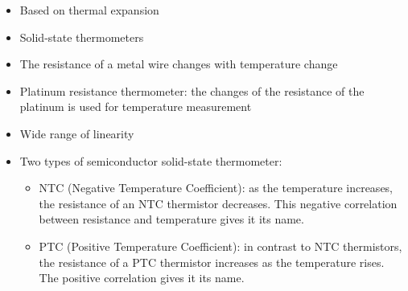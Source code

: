 \documentclass[t,aspectratio=169]{beamer}
\begin{document}
\begin{frame}
\begin{itemize}
\begin{center}
\end{center}
\begin{itemize}
\item Based on thermal expansion
\item Solid-state thermometers
\item The resistance of a metal wire changes with temperature change
\item Platinum resistance thermometer: the changes of the resistance of the platinum is used for
temperature measurement
\item Wide range of linearity
  
\pagebreak
\item Two types of semiconductor solid-state thermometer:
\begin{itemize}
\item NTC (Negative Temperature Coefficient): as the temperature increases, the resistance of an NTC thermistor   decreases. This negative correlation between resistance and temperature gives it its name.
\item  PTC (Positive Temperature Coefficient): in contrast to NTC thermistors, the resistance of a PTC thermistor increases as the temperature rises. The positive correlation gives it its name.
\end{itemize}
\end{itemize}


\end{itemize}
\end{frame}
\end{document}

